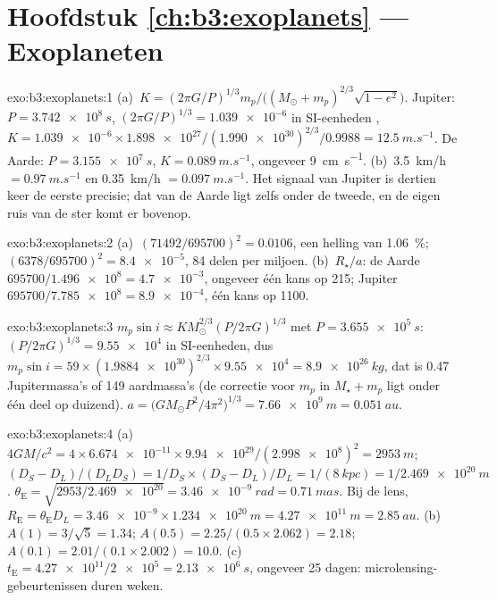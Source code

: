 \section*{Hoofdstuk \ref{ch:b3:exoplanets} --- Exoplaneten}

\begin{solution}{exo:b3:exoplanets:1}
(a)~$K = (2\pi G/P)^{1/3}m_p/\bigl((M_\odot + m_p)^{2/3}\sqrt{1 - e^2}\bigr)$.
Jupiter: $P = \qty{3.742e8}{s}$, $(2\pi G/P)^{1/3} = \num{1.039e-6}$ in SI-eenheden
, $K = \num{1.039e-6}\times\num{1.898e27}/(\num{1.990e30})^{2/3}/0.9988
= \qty{12.5}{m.s^{-1}}$. De Aarde: $P = \qty{3.155e7}{s}$, $K =
\qty{0.089}{m.s^{-1}}$, ongeveer \qty{9}{cm.s^{-1}}. (b)~\qty{3.5}{km/h} $=
\qty{0.97}{m.s^{-1}}$ en \qty{0.35}{km/h} $= \qty{0.097}{m.s^{-1}}$.
Het signaal van Jupiter is dertien keer de eerste precisie; dat van de Aarde
ligt zelfs onder de tweede, en de eigen ruis van de ster komt er bovenop.
\end{solution}

\begin{solution}{exo:b3:exoplanets:2}
(a)~$(71492/695700)^2 = \num{0.0106}$, een helling van \qty{1.06}{\percent};
$(6378/695700)^2 = \num{8.4e-5}$, 84 delen per miljoen. (b)~$R_\star/a$:
de Aarde $695700/\num{1.496e8} = \num{4.7e-3}$, ongeveer één kans op 215;
Jupiter $695700/\num{7.785e8} = \num{8.9e-4}$, één kans op 1100.
\end{solution}

\begin{solution}{exo:b3:exoplanets:3}
$m_p\sin i \approx K M_\odot^{2/3}(P/2\pi G)^{1/3}$ met $P =
\qty{3.655e5}{s}$: $(P/2\pi G)^{1/3} = \num{9.55e4}$ in SI-eenheden, dus $m_p
\sin i = 59\times(\num{1.9884e30})^{2/3}\times\num{9.55e4} =
\qty{8.9e26}{kg}$, dat is 0.47 Jupitermassa's of 149 aardmassa's (de
correctie voor $m_p$ in $M_\star + m_p$ ligt onder één deel op duizend).
$a = \bigl(GM_\odot P^2/4\pi^2\bigr)^{1/3} = \qty{7.66e9}{m} =
\qty{0.051}{au}$.
\end{solution}

\begin{solution}{exo:b3:exoplanets:4}
(a)~$4GM/c^2 = 4\times\num{6.674e-11}\times\num{9.94e29}/(\num{2.998e8})^2 =
\qty{2953}{m}$; $(D_S - D_L)/(D_LD_S) = 1/D_S\times(D_S - D_L)/D_L =
1/(\qty{8}{kpc}) = 1/\qty{2.469e20}{m}$. $\theta_\mathrm E =
\sqrt{2953/\num{2.469e20}} = \qty{3.46e-9}{rad} = \qty{0.71}{mas}$. Bij de
lens, $R_\mathrm E = \theta_\mathrm E D_L = \num{3.46e-9}\times
\qty{1.234e20}{m} = \qty{4.27e11}{m} = \qty{2.85}{au}$. (b)~$A(1) =
3/\sqrt5 = 1.34$; $A(0.5) = 2.25/(0.5\times2.062) = 2.18$; $A(0.1) =
2.01/(0.1\times2.002) = 10.0$. (c)~$t_\mathrm E = \num{4.27e11}/\num{2e5}
= \qty{2.13e6}{s}$, ongeveer 25 dagen: microlensing-gebeurtenissen duren weken.
\end{solution}

